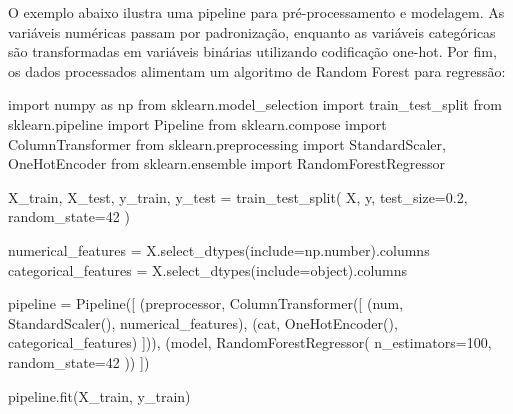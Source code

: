 \documentclass[
  12pt,
  a4paper,
]{scrreprt}
\newenvironment{Shaded}{}{}
\newcommand{\BuiltInTok}[1]{\textcolor[rgb]{0.84,0.23,0.29}{#1}}
\newcommand{\DecValTok}[1]{\textcolor[rgb]{0.00,0.36,0.77}{#1}}
\newcommand{\FloatTok}[1]{\textcolor[rgb]{0.00,0.36,0.77}{#1}}
\newcommand{\ImportTok}[1]{\textcolor[rgb]{0.01,0.18,0.38}{#1}}
\newcommand{\NormalTok}[1]{\textcolor[rgb]{0.14,0.16,0.18}{#1}}
\newcommand{\OperatorTok}[1]{\textcolor[rgb]{0.14,0.16,0.18}{#1}}
\newcommand{\StringTok}[1]{\textcolor[rgb]{0.01,0.18,0.38}{#1}}
\begin{document}
\vspace{12pt}

O exemplo abaixo ilustra uma pipeline para pré-processamento e
modelagem. As variáveis numéricas passam por padronização, enquanto as
variáveis categóricas são transformadas em variáveis binárias utilizando
codificação one-hot. Por fim, os dados processados alimentam um
algoritmo de Random Forest para regressão:

\begin{Shaded}
\begin{Highlighting}[]
\ImportTok{import}\NormalTok{ numpy }\ImportTok{as}\NormalTok{ np}
\ImportTok{from}\NormalTok{ sklearn.model\_selection }\ImportTok{import}\NormalTok{ train\_test\_split}
\ImportTok{from}\NormalTok{ sklearn.pipeline }\ImportTok{import}\NormalTok{ Pipeline}
\ImportTok{from}\NormalTok{ sklearn.compose }\ImportTok{import}\NormalTok{ ColumnTransformer}
\ImportTok{from}\NormalTok{ sklearn.preprocessing }\ImportTok{import}\NormalTok{ StandardScaler, OneHotEncoder}
\ImportTok{from}\NormalTok{ sklearn.ensemble }\ImportTok{import}\NormalTok{ RandomForestRegressor}

\NormalTok{X\_train, X\_test, y\_train, y\_test }\OperatorTok{=}\NormalTok{ train\_test\_split(}
\NormalTok{    X, y,}
\NormalTok{    test\_size}\OperatorTok{=}\FloatTok{0.2}\NormalTok{,}
\NormalTok{    random\_state}\OperatorTok{=}\DecValTok{42}
\NormalTok{)}

\NormalTok{numerical\_features }\OperatorTok{=}\NormalTok{ X.select\_dtypes(include}\OperatorTok{=}\NormalTok{np.number).columns}
\NormalTok{categorical\_features }\OperatorTok{=}\NormalTok{ X.select\_dtypes(include}\OperatorTok{=}\BuiltInTok{object}\NormalTok{).columns}

\NormalTok{pipeline }\OperatorTok{=}\NormalTok{ Pipeline([}
\NormalTok{    (}\StringTok{\textquotesingle{}preprocessor\textquotesingle{}}\NormalTok{, ColumnTransformer([}
\NormalTok{        (}\StringTok{\textquotesingle{}num\textquotesingle{}}\NormalTok{, StandardScaler(), numerical\_features),}
\NormalTok{        (}\StringTok{\textquotesingle{}cat\textquotesingle{}}\NormalTok{, OneHotEncoder(), categorical\_features)}
\NormalTok{    ])),}
\NormalTok{    (}\StringTok{\textquotesingle{}model\textquotesingle{}}\NormalTok{, RandomForestRegressor(}
\NormalTok{        n\_estimators}\OperatorTok{=}\DecValTok{100}\NormalTok{,}
\NormalTok{        random\_state}\OperatorTok{=}\DecValTok{42}
\NormalTok{    ))}
\NormalTok{])}

\NormalTok{pipeline.fit(X\_train, y\_train)}
\end{Highlighting}
\end{Shaded}
\end{document}
